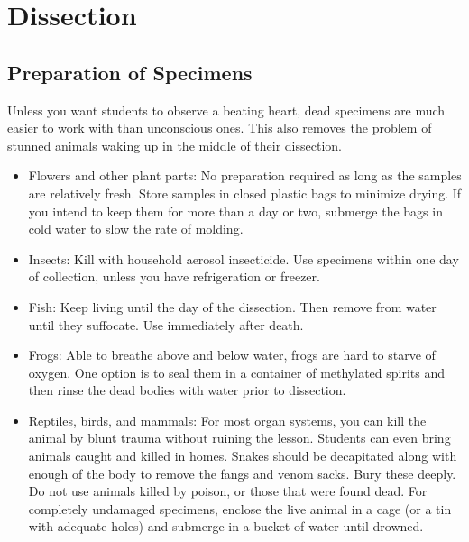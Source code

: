 \chapter{Dissection}

\section{Preparation of Specimens}

Unless you want students to observe a beating heart, 
dead specimens are much easier to work with than unconscious ones. 
This also removes the problem of stunned animals waking up 
in the middle of their dissection.

\begin{itemize}

\item{Flowers and other plant parts: 
No preparation required as long as the samples are relatively fresh. 
Store samples in closed plastic bags to minimize drying. 
If you intend to keep them for more than a day or two, 
submerge the bags in cold water to slow the rate of molding.}

\item{Insects: Kill with household aerosol insecticide. 
Use specimens within one day of collection, 
unless you have refrigeration or freezer.}

\item{Fish: Keep living until the day of the dissection. 
Then remove from water until they suffocate. 
Use immediately after death.}

\item{Frogs: Able to breathe above and below water, 
frogs are hard to starve of oxygen. 
One option is to seal them in a container of methylated spirits 
and then rinse the dead bodies with water prior to dissection.}

\item{Reptiles, birds, and mammals: For most organ systems, 
you can kill the animal by blunt trauma without ruining the lesson. 
Students can even bring animals caught and killed in homes. 
Snakes should be decapitated along with enough of the body 
to remove the fangs and venom sacks. 
Bury these deeply. 
Do not use animals killed by poison, 
or those that were found dead. 
For completely undamaged specimens, 
enclose the live animal in a cage (or a tin with adequate holes) 
and submerge in a bucket of water until drowned.}


\end{itemize}
